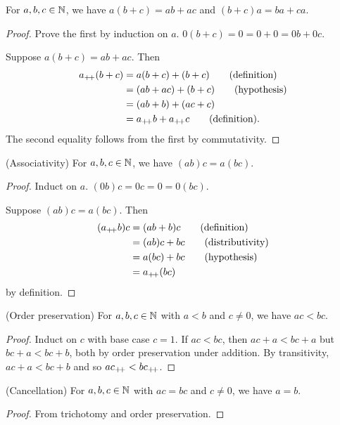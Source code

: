 \begin{proposition}[Distributivity] \label{thm:distributivity}
    For $a, b, c \in \mathbb{N}$, we have $a(b + c) = ab + ac$ and $(b + c)a = ba + ca$.
\end{proposition}
\begin{proof}
    Prove the first by induction on $a$.
    $0(b + c) = 0 = 0 + 0 = 0b + 0c$.

    Suppose $a(b + c) = ab + ac$.
    Then \begin{align*}
        a_{+\!+}(b + c) &= a(b + c) + (b + c) \tag{definition} \\
                    &= (ab + ac) + (b + c) \tag{hypothesis} \\
                    &= (ab + b) + (ac + c) \\
                    &= a_{+\!+} b + a_{+\!+} c \tag{definition}.
    \end{align*}
    The second equality follows from the first by commutativity.
\end{proof}

\begin{exercise}
    (Associativity) For $a, b, c \in \mathbb{N}$, we have $(ab)c = a(bc)$.
\end{exercise}
\begin{proof}
    Induct on $a$.
    $(0b)c = 0c = 0 = 0(bc)$.

    Suppose $(ab)c = a(bc)$.
    Then \begin{align*}
        (a_{+\!+} b)c &= (ab + b)c \tag{definition} \\
                  &= (ab)c + bc \tag{distributivity} \\
                  &= a(bc) + bc \tag{hypothesis} \\
                  &= a_{+\!+}(bc)
    \end{align*} by definition.
\end{proof}
\begin{exercise}
    (Order preservation) For $a, b, c \in \mathbb{N}$ with $a < b$ and $c \ne 0$,
    we have $ac < bc$.
\end{exercise}
\begin{proof}
    Induct on $c$ with base case $c = 1$.
    If $ac < bc$, then $ac + a < bc + a$ but $bc + a < bc + b$, both by order
    preservation under addition.
    By transitivity, $ac + a < bc + b$ and so $ac_{+\!+} < bc_{+\!+}$.
\end{proof}
\begin{exercise}
    (Cancellation) For $a, b, c \in \mathbb{N}$ with $ac = bc$ and $c \ne 0$, we have
    $a = b$.
\end{exercise}
\begin{proof}
    From trichotomy and order preservation.
\end{proof}

